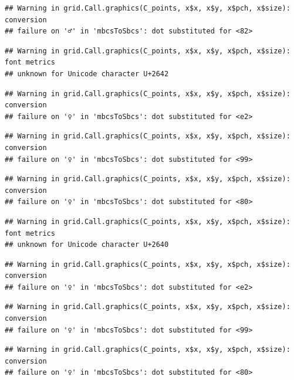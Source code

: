 \documentclass[
]{book}
\begin{document}
\begin{verbatim}
## Warning in grid.Call.graphics(C_points, x$x, x$y, x$pch, x$size): conversion
## failure on '♂' in 'mbcsToSbcs': dot substituted for <82>
\end{verbatim}

\begin{verbatim}
## Warning in grid.Call.graphics(C_points, x$x, x$y, x$pch, x$size): font metrics
## unknown for Unicode character U+2642
\end{verbatim}

\begin{verbatim}
## Warning in grid.Call.graphics(C_points, x$x, x$y, x$pch, x$size): conversion
## failure on '♀' in 'mbcsToSbcs': dot substituted for <e2>
\end{verbatim}

\begin{verbatim}
## Warning in grid.Call.graphics(C_points, x$x, x$y, x$pch, x$size): conversion
## failure on '♀' in 'mbcsToSbcs': dot substituted for <99>
\end{verbatim}

\begin{verbatim}
## Warning in grid.Call.graphics(C_points, x$x, x$y, x$pch, x$size): conversion
## failure on '♀' in 'mbcsToSbcs': dot substituted for <80>
\end{verbatim}

\begin{verbatim}
## Warning in grid.Call.graphics(C_points, x$x, x$y, x$pch, x$size): font metrics
## unknown for Unicode character U+2640
\end{verbatim}

\begin{verbatim}
## Warning in grid.Call.graphics(C_points, x$x, x$y, x$pch, x$size): conversion
## failure on '♀' in 'mbcsToSbcs': dot substituted for <e2>
\end{verbatim}

\begin{verbatim}
## Warning in grid.Call.graphics(C_points, x$x, x$y, x$pch, x$size): conversion
## failure on '♀' in 'mbcsToSbcs': dot substituted for <99>
\end{verbatim}

\begin{verbatim}
## Warning in grid.Call.graphics(C_points, x$x, x$y, x$pch, x$size): conversion
## failure on '♀' in 'mbcsToSbcs': dot substituted for <80>
\end{verbatim}
\end{document}
